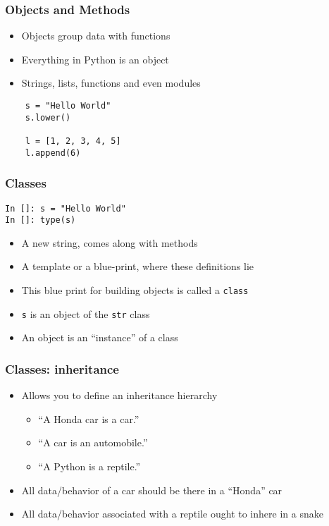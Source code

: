 \documentclass[14pt,compress,aspectratio=169]{beamer}
\begin{document}
\begin{frame}[fragile]
  \frametitle{Objects and Methods}
  \begin{itemize}
  \item Objects group data with functions
  \item Everything in Python is an object
  \item Strings, lists, functions and even modules
  \end{itemize}
  \begin{lstlisting}
    s = "Hello World"
    s.lower()

    l = [1, 2, 3, 4, 5]
    l.append(6)
  \end{lstlisting}
\end{frame}

\begin{frame}[fragile]
  \frametitle{Classes}
  \begin{lstlisting}
In []: s = "Hello World"
In []: type(s)
  \end{lstlisting}
  \begin{itemize}
  \item A new string, comes along with methods
  \item A template or a blue-print, where these definitions lie
  \item This blue print for building objects is called a
    \lstinline{class}
  \item \lstinline{s} is an object of the \lstinline{str} class
  \item An object is an ``instance'' of a class
  \end{itemize}
\end{frame}


\begin{frame}[fragile]
  \frametitle{Classes: inheritance}
  \begin{itemize}
  \item Allows you to define an inheritance hierarchy
    \begin{itemize}
    \item ``A Honda car \alert{is a} car.''
    \item ``A car \alert{is an} automobile.''
    \item ``A Python \alert{is a} reptile.''
    \end{itemize}
  \item All data/behavior of a car should be there in a ``Honda'' car
  \item All data/behavior associated with a reptile ought to inhere in a snake
  \end{itemize}
\end{frame}
\end{document}
